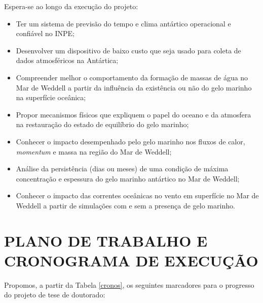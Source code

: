 \documentclass{article}
\begin{document}
Espera-se ao longo da execução do projeto:

\begin{itemize}
	\item Ter um sistema de previsão do tempo e clima antártico operacional e confiável no INPE;
	\item Desenvolver um dispositivo de baixo custo que seja usado para coleta de dados atmosféricos na Antártica;
	\item Compreender melhor o comportamento da formação de massas de água no Mar de Weddell a partir da influência da existência ou não 
	do gelo marinho na superfície oceânica;
	\item Propor mecanismos físicos que expliquem o papel do oceano e da atmosfera na restauração do estado de equilíbrio do gelo marinho;
	\item Conhecer o impacto desempenhado pelo gelo marinho nos fluxos de calor, \textit{momentum} e massa na região do Mar de Weddell;
	\item Análise da persistência (dias ou meses) de uma condição de máxima concentração e espessura do gelo marinho antártico no Mar de Weddell; 
	\item Conhecer o impacto das correntes oceânicas no vento em superfície no Mar de Weddell a partir de simulações com e sem a presença de gelo marinho.
\end{itemize}

\section{PLANO DE TRABALHO E CRONOGRAMA DE EXECUÇÃO}
\bigskip

Propomos, a partir da \textcolor{bleu_cite}{Tabela \ref{cronos}}, os seguintes marcadores para o progresso do projeto de tese de doutorado:
\end{document}
